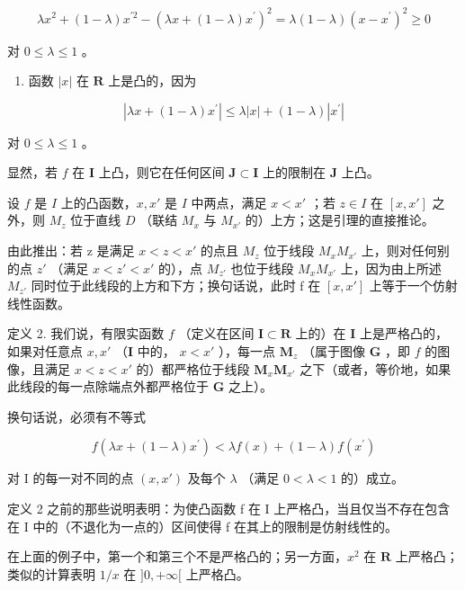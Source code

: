 \[
\lambda x ^ {2} + (1 - \lambda) x ^ {\prime 2} - \left(\lambda x + (1 - \lambda) x ^ {\prime}\right) ^ {2} = \lambda (1 - \lambda) (x - x ^ {\prime}) ^ {2} \geqslant 0
\]

对 \(0 \leqslant \lambda \leqslant 1\) 。

\begin{enumerate}
\def\labelenumi{\arabic{enumi})}
\setcounter{enumi}{2}
\tightlist
\item
  函数 \(|x|\) 在 \(\mathbf{R}\) 上是凸的，因为
\end{enumerate}

\[
\left| \lambda x + (1 - \lambda) x ^ {\prime} \right| \leqslant \lambda | x | + (1 - \lambda) \left| x ^ {\prime} \right|
\]

对 \(0 \leqslant \lambda \leqslant 1\) 。

显然，若 \(f\) 在 \(\mathbf{I}\) 上凸，则它在任何区间 \(\mathbf{J} \subset \mathbf{I}\) 上的限制在 \(\mathbf{J}\) 上凸。

设 \(f\) 是 \(I\) 上的凸函数，\(x, x'\) 是 \(I\) 中两点，满足 \(x < x'\) ；若 \(z \in I\) 在 \([x, x']\) 之外，则 \(M_z\) 位于直线 \(D\) （联结 \(M_x\) 与 \(M_{x'}\) 的）上方；这是引理的直接推论。

由此推出：若 z 是满足 \(x < z < x'\) 的点且 \(M_{z}\) 位于线段 \(M_{x}M_{x'}\) 上，则对任何别的点 \(z'\) （满足 \(x < z' < x'\) 的），点 \(M_{z'}\) 也位于线段 \(M_{x}M_{x'}\) 上，因为由上所述 \(M_{z'}\) 同时位于此线段的上方和下方；换句话说，此时 f 在 \([x, x']\) 上等于一个仿射线性函数。

定义 2. 我们说，有限实函数 \(f\) （定义在区间 \(\mathbf{I} \subset \mathbf{R}\) 上的）在 \(\mathbf{I}\) 上是严格凸的，如果对任意点 \(x, x'\) （\(\mathbf{I}\) 中的， \(x < x'\) ），每一点 \(\mathbf{M}_z\) （属于图像 \(\mathbf{G}\) ，即 \(f\) 的图像，且满足 \(x < z < x'\) 的）都严格位于线段 \(\mathbf{M}_x\mathbf{M}_{x'}\) 之下（或者，等价地，如果此线段的每一点除端点外都严格位于 \(\mathbf{G}\) 之上）。

换句话说，必须有不等式

\[
f (\lambda x + (1 - \lambda) x ^ {\prime}) <   \lambda f (x) + (1 - \lambda) f (x ^ {\prime})\tag{2}
\]

对 I 的每一对不同的点 \((x, x')\) 及每个 \(\lambda\) （满足 \(0 < \lambda < 1\) 的）成立。

定义 2 之前的那些说明表明：为使凸函数 f 在 I 上严格凸，当且仅当不存在包含在 I 中的（不退化为一点的）区间使得 f 在其上的限制是仿射线性的。

在上面的例子中，第一个和第三个不是严格凸的；另一方面，\(x^2\) 在 \(\mathbf{R}\) 上严格凸；类似的计算表明 \(1 / x\) 在 \(]0, +\infty[\) 上严格凸。

